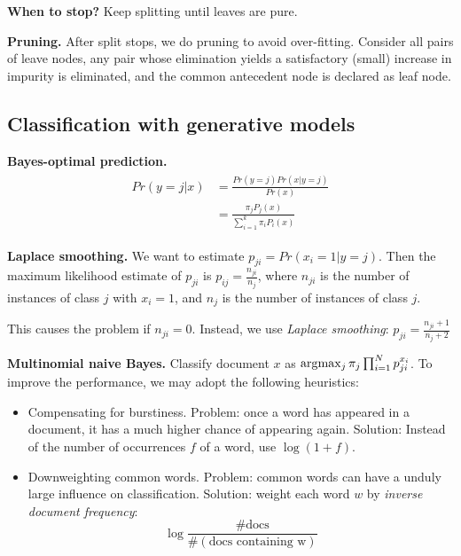 \textbf{When to stop?}\hspace{0.2cm} Keep splitting until leaves are pure. 

\textbf{Pruning.}\hspace{0.2cm} After split stops, we do pruning to avoid over-fitting. Consider all pairs of leave nodes,
any pair whose elimination yields a satisfactory (small)
increase in impurity is eliminated, and the common
antecedent node is declared as leaf node.

\subsection{Classification with generative models}

\textbf{Bayes-optimal prediction.}\hspace{0.2cm}
\begin{align}
	\begin{split}
	Pr(y= j | x) &= \frac{Pr(y= j) Pr(x|y=j)}{Pr(x)} \\
		&= \frac{\pi_j P_j(x)}{\sum_{i=1}^{k} \pi_i P_i(x)}
	\end{split}
\end{align}


\textbf{Laplace smoothing.}\hspace{0.2cm}
We want to estimate $p_{ji} = Pr(x_i = 1 | y=j)$. Then the maximum likelihood estimate of $p_{ji}$ is $p_{ij} = \frac{n_{ji}}{n_j}$, where $n_{ji}$ is the number of instances of class $j$ with $x_i = 1$, and $n_j$ is the number of 
instances of class $j$. 
\begin{remark}
This causes the problem if $n_{ji} = 0$. Instead, we use \textit{Laplace smoothing}: $p_{ji} = \frac{n_{ji} + 1}{n_j + 2}$
\end{remark} 


\textbf{Multinomial naive Bayes.}\hspace{0.2cm}
Classify document $x$ as $\arg\!\max_j \pi_j \prod_{i=1}^{N} p_{ji} ^ {x_i}$.
To improve the performance, we may adopt the following heuristics:
\begin{itemize}
	\item Compensating for burstiness. Problem: once a word has appeared in a document, it has a much higher chance of appearing again.
	Solution: Instead of the number of occurrences $f$ of a word, use
	$\log(1 + f )$.
	
	\item Downweighting common words. Problem: common words can have a unduly large influence on classification. Solution: weight each word $w$ by \textit{inverse document frequency}:
	\[
		\log\frac{\# \text{docs}}{\#(\text{docs containing w})}
	\]
\end{itemize}

